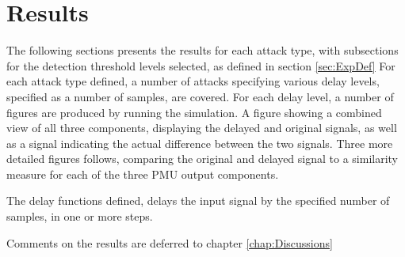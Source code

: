 \chapter{Results} \label{chap:Results}


The following sections presents the results for each attack type, with subsections for the detection threshold levels selected, as defined in section \ref{sec:ExpDef} 
For each attack type defined, a number of attacks specifying various delay levels, specified as a number of samples, are covered.
For each delay level, a number of figures are produced by running the simulation.
A figure showing a combined view of all three components, displaying the delayed and original signals, as well as a signal indicating the actual difference between the two signals.  Three more detailed figures follows, comparing the original and delayed signal to a similarity measure for each of the three PMU output components.

The delay functions defined, delays the input signal by the specified number of samples, in one or more steps.





Comments on the results are deferred to chapter \ref{chap:Discussions}

%








%

%

%

